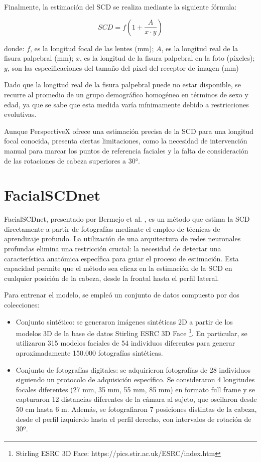 Finalmente, la estimación del SCD se realiza mediante la siguiente fórmula:

\begin{equation}
	SCD = f (1+\frac{A}{x \cdot y})
\end{equation}

donde: $f$, es la longitud focal de las lentes (mm); $A$, es la longitud real de la fisura palpebral (mm); $x$, es la longitud de la fisura palpebral en la foto (píxeles); $y$, son las especificaciones del tamaño del píxel del receptor de imagen (mm)

Dado que la longitud real de la fisura palpebral puede no estar disponible, se recurre al promedio de un grupo demográfico homogéneo en términos de sexo y edad, ya que se sabe que esta medida varía mínimamente debido a restricciones evolutivas.

Aunque PerspectiveX ofrece una estimación precisa de la SCD para una longitud focal conocida, presenta ciertas limitaciones, como la necesidad de intervención manual para marcar los puntos de referencia faciales y la falta de consideración de las rotaciones de cabeza superiores a 30°.

\section{FacialSCDnet}

FacialSCDnet, presentado por Bermejo et al. \cite{14}, es un método que estima la SCD directamente a partir de fotografías mediante el empleo de técnicas de aprendizaje profundo. La utilización de una arquitectura de redes neuronales profundas elimina una restricción crucial: la necesidad de detectar una característica anatómica específica para guiar el proceso de estimación. Esta capacidad permite que el método sea eficaz en la estimación de la SCD en cualquier posición de la cabeza, desde la frontal hasta el perfil lateral.

Para entrenar el modelo, se empleó un conjunto de datos compuesto por dos colecciones: 

\begin{itemize}
	\item Conjunto sintético: se generaron imágenes sintéticas 2D a partir de los modelos 3D de la base de datos Stirling ESRC 3D Face \footnote{Stirling ESRC 3D Face: https://pics.stir.ac.uk/ESRC/index.htm}. En particular, se utilizaron 315 modelos faciales de 54 individuos diferentes para generar aproximadamente 150.000 fotografías sintéticas.
	\item Conjunto de fotografías digitales: se adquirieron fotografías de 28 individuos siguiendo un protocolo de adquisición específico. Se consideraron 4 longitudes focales diferentes (27 mm, 35 mm, 55 mm, 85 mm) en formato full frame y se capturaron 12 distancias diferentes de la cámara al sujeto, que oscilaron desde 50 cm hasta 6 m. Además, se fotografiaron 7 posiciones distintas de la cabeza, desde el perfil izquierdo hasta el perfil derecho, con intervalos de rotación de 30º.
\end{itemize}

